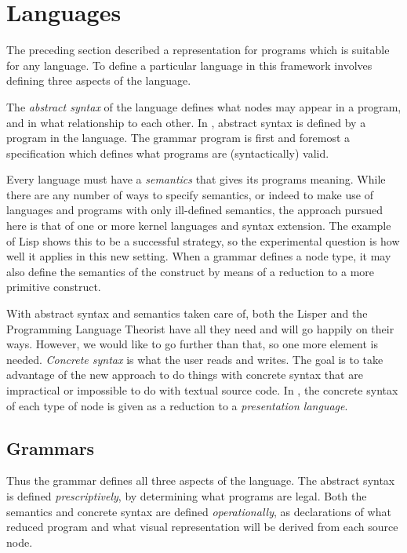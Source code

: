 \section{Languages}
The preceding section described a representation for programs which is suitable for any language. To define a particular language in this framework involves defining three aspects of the language.

The \emph{abstract syntax} of the language defines what nodes may appear in a program, and in what relationship to each other. In \Meta, abstract syntax is defined by a program in the  language. The grammar program is first and foremost a specification which defines what programs are (syntactically) valid. 

Every language must have a \emph{semantics} that gives its programs meaning. While there are any number of ways to specify semantics, or indeed to make use of languages and programs with only ill-defined semantics, the approach pursued here is that of one or more kernel languages and syntax extension. The example of Lisp shows this to be a successful strategy, so the experimental question is how well it applies in this new setting. When a grammar defines a node type, it may also define the semantics of the construct by means of a reduction to a more primitive construct.

With abstract syntax and semantics taken care of, both the Lisper and the Programming Language Theorist have all they need and will go happily on their ways. However, we would like to go further than that, so one more element is needed. \emph{Concrete syntax} is what the user reads and writes. The goal is to take advantage of the new approach to do things with concrete syntax that are impractical or impossible to do with textual source code. In \Meta, the concrete syntax of each type of node is given as a reduction to a \emph{presentation language}.


\subsection{Grammars}
\label{grammars}
Thus the grammar defines all three aspects of the language. The abstract syntax is defined \emph{prescriptively}, by determining what programs are legal. Both the semantics and concrete syntax are defined \emph{operationally}, as declarations of what reduced program and what visual representation will be derived from each source node.

